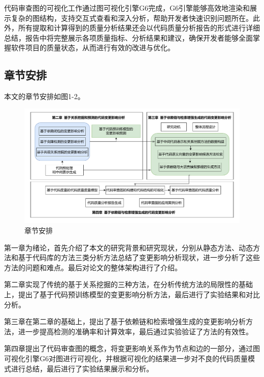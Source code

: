 代码审查图的可视化工作通过图可视化引擎G6完成，G6引擎能够高效地渲染和展示复杂的图结构，支持交互式查看和深入分析，帮助开发者快速识别问题所在。此外，所有提取和计算得到的质量分析结果还会以代码质量分析报告的形式进行详细总结，报告中将完整展示各项质量指标、分析结果和建议，确保开发者能够全面掌握软件项目的质量状态，从而进行有效的改进与优化。

\subsection{章节安排}

本文的章节安排如图1-2。

\begin{figure}[h]
\centering
\includegraphics[width = 1.0\textwidth]{figures/1_章节结构图.pdf}
\caption{章节安排}
\end{figure}

第一章为绪论，首先介绍了本文的研究背景和研究现状，分别从静态方法、动态方法和基于代码库的方法三类分析方法总结了变更影响分析现状，进一步分析了这些方法的问题和难点。最后对论文的整体架构进行了介绍。


第二章实现了传统的基于关系挖掘的三种方法，在分析传统方法的局限性的基础上，提出了基于代码预训练模型的变更影响分析方法，最后进行了实验结果和对比分析。

第三章在第二章的基础上，提出了基于依赖链和检索增强生成的变更影响分析方法，进一步提高检测的准确率和计算效率，最后通过实验验证了方法的有效性。

第四章提出了代码审查图的概念，将变更影响关系作为节点和边的一部分，通过图可视化引擎G6对图进行可视化，并根据可视化的结果进一步对不良的代码质量模式进行总结，最后进行了实验结果展示和分析。



